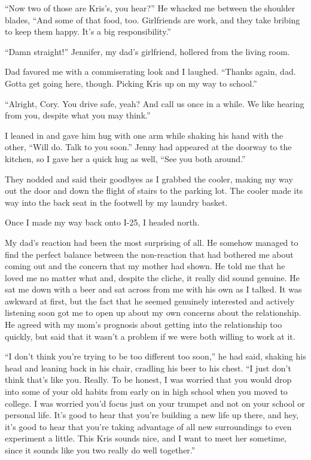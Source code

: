 ``Now two of those are Kris's, you hear?''  He whacked me between the shoulder blades, ``And some of that food, too.  Girlfriends are work, and they take bribing to keep them happy.  It's a big responsibility.''

``Damn straight!'' Jennifer, my dad's girlfriend, hollered from the living room.

Dad favored me with a commiserating look and I laughed.  ``Thanks again, dad.  Gotta get going here, though.  Picking Kris up on my way to school.''

``Alright, Cory.  You drive safe, yeah?  And call us once in a while.  We like hearing from you, despite what you may think.''

I leaned in and gave him hug with one arm while shaking his hand with the other, ``Will do.  Talk to you soon.''  Jenny had appeared at the doorway to the kitchen, so I gave her a quick hug as well, ``See you both around.''

They nodded and said their goodbyes as I grabbed the cooler, making my way out the door and down the flight of stairs to the parking lot.  The cooler made its way into the back seat in the footwell by my laundry basket.

Once I made my way back onto I-25, I headed north.

My dad's reaction had been the most surprising of all.  He somehow managed to find the perfect balance between the non-reaction that had bothered me about coming out and the concern that my mother had shown.  He told me that he loved me no matter what and, despite the cliche, it really did sound genuine.  He sat me down with a beer and sat across from me with his own as I talked.  It was awkward at first, but the fact that he seemed genuinely interested and actively listening soon got me to open up about my own concerns about the relationship.  He agreed with my mom's prognosis about getting into the relationship too quickly, but said that it wasn't a problem if we were both willing to work at it.

``I don't think you're trying to be too different too soon,'' he had said, shaking his head and leaning back in his chair, cradling his beer to his chest.  ``I just don't think that's like you.  Really.  To be honest, I was worried that you would drop into some of your old habits from early on in high school when you moved to college.  I was worried you'd focus just on your trumpet and not on your school or personal life.  It's good to hear that you're building a new life up there, and hey, it's good to hear that you're taking advantage of all new surroundings to even experiment a little.  This Kris sounds nice, and I want to meet her sometime, since it sounds like you two really do well together.''

